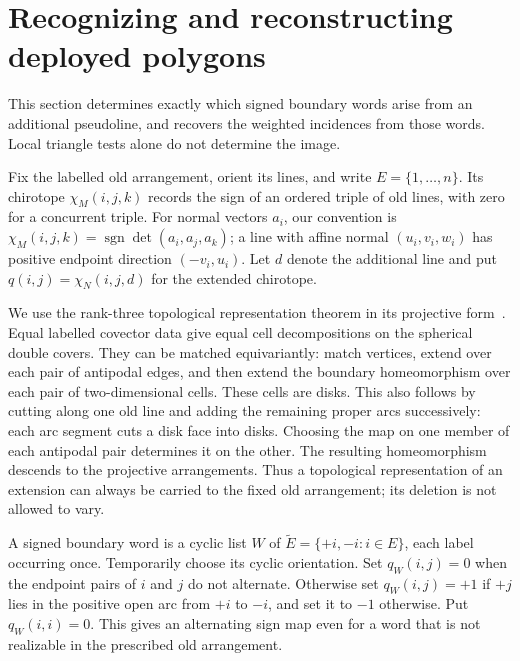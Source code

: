 \section{Recognizing and reconstructing deployed polygons}
\label{sec:polygons}
This section determines exactly which signed boundary words arise from
an additional pseudoline, and recovers the weighted incidences from
those words. Local triangle tests alone do not determine the image.

Fix the labelled old arrangement, orient its lines, and write
$E=\{1,\ldots,n\}$. Its chirotope $\chi_M(i,j,k)$ records the sign
of an ordered triple of old lines, with zero for a concurrent triple.
For normal vectors $a_i$, our convention is
$\chi_M(i,j,k)=\operatorname{sgn}\det(a_i,a_j,a_k)$; a line with
affine normal $(u_i,v_i,w_i)$ has positive endpoint direction
$(-v_i,u_i)$. Let $d$ denote the additional line and put
$q(i,j)=\chi_N(i,j,d)$ for the extended chirotope.

We use the rank-three topological representation theorem in its
projective form~\cite[Section~7.1.4, pp.~6--7]{RGZ}.
Equal labelled covector data give equal cell decompositions on the
spherical double covers. They can be matched equivariantly: match
vertices, extend over each pair of antipodal edges, and then extend
the boundary homeomorphism over each pair of two-dimensional cells.
These cells are disks. This also follows by cutting along one old
line and adding the remaining proper arcs successively: each arc
segment cuts a disk face into disks. Choosing the map on one member
of each antipodal pair determines it on the other. The resulting
homeomorphism descends to the projective arrangements. Thus a
topological representation of an extension can always be carried to
the fixed old arrangement; its deletion is not allowed to vary.

A signed boundary word is a cyclic list $W$ of
$\widetilde E=\{+i,-i:i\in E\}$, each label occurring once.
Temporarily choose its cyclic orientation. Set $q_W(i,j)=0$ when
the endpoint pairs of $i$ and $j$ do not alternate. Otherwise set
$q_W(i,j)=+1$ if $+j$ lies in the positive open arc from $+i$ to
$-i$, and set it to $-1$ otherwise. Put $q_W(i,i)=0$.
This gives an alternating sign map even for a word that is not
realizable in the prescribed old arrangement.

